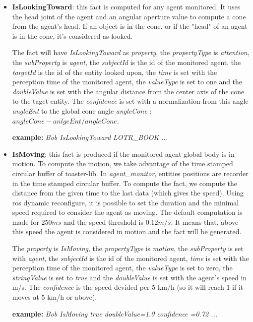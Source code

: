 \documentclass[a4paper]{article}
\begin{document}
\begin{itemize}
\item \textbf{IsLookingToward}: this fact is computed for any agent monitored. It uses the head joint of the agent and an angular aperture value to compute a cone from the agent's head. If an object is in the cone, or if the "head" of an agent is in the cone, it's considered as looked.

The fact will have \textit{IsLookingToward} as \textit{property}, the \textit{propertyType} is \textit{attention}, the \textit{subProperty} is \textit{agent}, the \textit{subjectId} is the id of the monitored agent, the \textit{targetId} is the id of the entity looked upon, the \textit{time} is set with the perception time of the monitored agent, the \textit{valueType} is set to one and the \textit{doubleValue} is set with the angular distance from the center axis of the cone to the taget entity. The \textit{confidence} is set with a normalization from this angle \textit{angleEnt} to the global cone angle \textit{angleCone} : $angleCone-anlgeEnt/angleCone$.

\textbf{example:} \textit{Bob IsLookingToward LOTR\_BOOK ...}

\item \textbf{IsMoving}: this fact is produced if the monitored agent global body is in motion.
To compute the motion, we take advantage of the time stamped circular buffer of toaster-lib. In \textit{agent\_monitor}, entities positions are recorder in the time stamped circular buffer. To compute the fact, we compute the distance from the given time to the last data (which gives the speed). Using ros dynamic reconfigure, it is possible to set the duration and the minimal speed required to consider the agent as moving. The default computation is made for $250ms$ and the speed threshold is $0.12 m/s$. It means that, above this speed the agent is considered in motion and the fact will be generated. 

The \textit{property} is \textit{IsMoving}, the \textit{propertyType} is \textit{motion}, the \textit{subProperty} is set with \textit{agent}, the \textit{subjectId} is the id of the monitored agent, \textit{time} is set with the perception time of the monitored agent, the \textit{valueType} is set to zero, the \textit{stringValue} is set to \textit{true} and the \textit{doubleValue} is set with the agent's speed in m/s. The \textit{confidence} is the speed devided per 5 km/h (so it will reach 1 if it moves at 5 km/h or above).

\textbf{example:} \textit{Bob IsMoving true doubleValue=1.0 confidence =0.72 ...}


\end{itemize}
\end{document}
